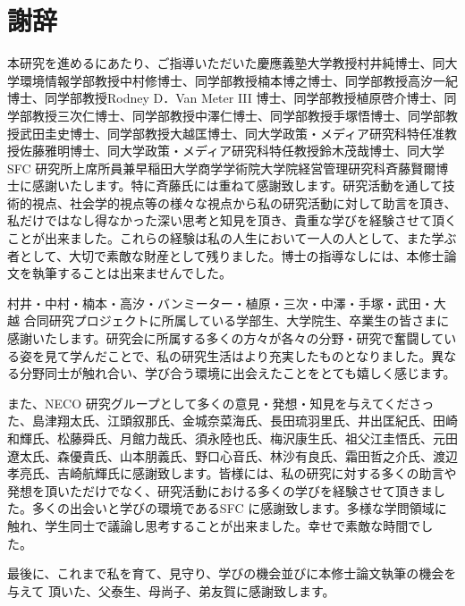 \chapter*{謝辞}
\label{thanks}

本研究を進めるにあたり、ご指導いただいた慶應義塾大学教授村井純博士、同大学環境情報学部教授中村修博士、同学部教授楠本博之博士、同学部教授高汐一紀博士、同学部教授Rodney D．Van Meter III 博士、同学部教授植原啓介博士、同学部教授三次仁博士、同学部教授中澤仁博士、同学部教授手塚悟博士、同学部教授武田圭史博士、同学部教授大越匡博士、同大学政策・メディア研究科特任准教授佐藤雅明博士、同大学政策・メディア研究科特任教授鈴木茂哉博士、同大学SFC 研究所上席所員兼早稲田大学商学学術院大学院経営管理研究科斉藤賢爾博士に感謝いたします。特に斉藤氏には重ねて感謝致します。研究活動を通して技術的視点、社会学的視点等の様々な視点から私の研究活動に対して助言を頂き、私だけではなし得なかった深い思考と知見を頂き、貴重な学びを経験させて頂くことが出来ました。これらの経験は私の人生において一人の人として、また学ぶ者として、大切で素敵な財産として残りました。博士の指導なしには、本修士論文を執筆することは出来ませんでした。

村井・中村・楠本・高汐・バンミーター・植原・三次・中澤・手塚・武田・大越 合同研究プロジェクトに所属している学部生、大学院生、卒業生の皆さまに感謝いたします。研究会に所属する多くの方々が各々の分野・研究で奮闘している姿を見て学んだことで、私の研究生活はより充実したものとなりました。異なる分野同士が触れ合い、学び合う環境に出会えたことをとても嬉しく感じます。

また、NECO 研究グループとして多くの意見・発想・知見を与えてくださった、島津翔太氏、江頭叙那氏、金城奈菜海氏、長田琉羽里氏、井出匡紀氏、田崎和輝氏、松藤舜氏、月館力哉氏、須永陸也氏、梅沢康生氏、祖父江圭悟氏、元田遼太氏、森優貴氏、山本朋義氏、野口心音氏、林沙有良氏、霜田哲之介氏、渡辺孝亮氏、吉崎航輝氏に感謝致します。皆様には、私の研究に対する多くの助言や発想を頂いただけでなく、研究活動における多くの学びを経験させて頂きました。多くの出会いと学びの環境であるSFC に感謝致します。多様な学問領域に触れ、学生同士で議論し思考することが出来ました。幸せで素敵な時間でした。

最後に、これまで私を育て、見守り、学びの機会並びに本修士論文執筆の機会を与えて
頂いた、父泰生、母尚子、弟友賀に感謝致します。



